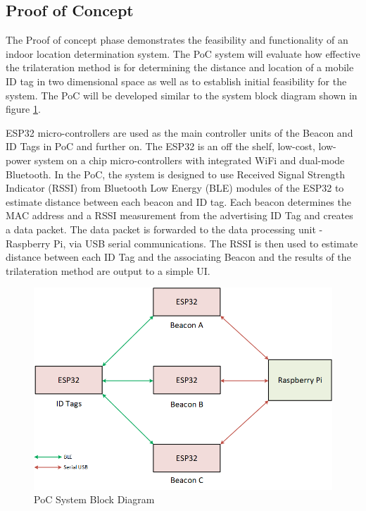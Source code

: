 \pagebreak
\subsection{Proof of Concept}
\medskip
The Proof of concept phase demonstrates the feasibility and functionality of an indoor location determination system. The \Gls{PoC} system will evaluate how effective the trilateration method is for determining the distance and location of a mobile ID tag in two dimensional space as well as to establish initial feasibility for the system. The PoC will be developed similar to the system block diagram shown in figure \ref{poc}.

\bigskip
ESP32 micro-controllers are used as the main controller units of the Beacon and ID Tags in PoC and further on. The ESP32 is an off the shelf, low-cost, low-power system on a chip micro-controllers with integrated WiFi and dual-mode Bluetooth. In the PoC, the system is designed to use Received Signal Strength Indicator (\Gls{RSSI}) from Bluetooth Low Energy (BLE) modules of the ESP32 to estimate distance between each beacon and ID tag. Each beacon determines the MAC address and a RSSI measurement from the advertising ID Tag and creates a data packet. The data packet is forwarded to the data processing unit - Raspberry Pi, via USB serial communications. The \Gls{RSSI} is then used to estimate distance between each ID Tag and the associating Beacon and the results of the trilateration method are output to a simple UI. 

\bigskip
\begin{figure}[H]
\centering
    \includegraphics[width=\linewidth]{./images/01_poc.png}
    \caption{PoC System Block Diagram}
    \label{poc}
\end{figure}



